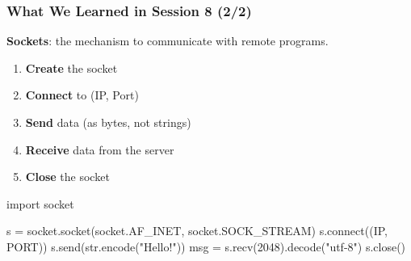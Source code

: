 \documentclass[xcolor=table]{beamer}
\begin{document}
\begin{frame}[fragile]
\frametitle{What We Learned in Session 8 (2/2)}

\textbf{Sockets}: the mechanism to communicate with remote programs.

\vspace{0.2cm}

\begin{enumerate}
\item \textbf{Create} the socket
\item \textbf{Connect} to (IP, Port)
\item \textbf{Send} data (as bytes, not strings)
\item \textbf{Receive} data from the server
\item \textbf{Close} the socket
\end{enumerate}

\vspace{0.2cm}

\begin{python}
import socket

s = socket.socket(socket.AF_INET,
                  socket.SOCK_STREAM)
s.connect((IP, PORT))
s.send(str.encode("Hello!"))
msg = s.recv(2048).decode("utf-8")
s.close()
\end{python}

\end{frame}
\end{document}
